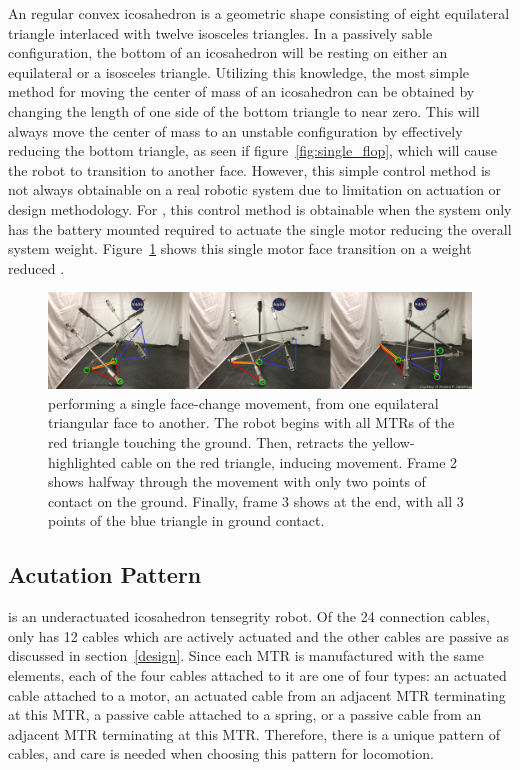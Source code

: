 An regular convex icosahedron is a geometric shape consisting of eight equilateral triangle interlaced with twelve isosceles triangles.
In a passively sable configuration, the bottom of an icosahedron will be resting on either an equilateral or a isosceles triangle.
Utilizing this knowledge, the most simple method for moving the center of mass of an icosahedron can be obtained by changing the length of one side of the bottom triangle to near zero.
This will always move the center of mass to an unstable configuration by effectively reducing the bottom triangle, as seen if figure~\ref{fig:single_flop}, which will cause the robot to transition to another face.
However, this simple control method is not always obtainable on a real robotic system due to limitation on actuation or design methodology.
For \SB{}, this control method is obtainable when the system only has the battery mounted required to actuate the single motor reducing the overall system weight.
Figure~\ref{fig:superball_flop_flat} shows this single motor face transition on a weight reduced \SB{}.

\begin{figure}[thbp]
    \centering
    \includegraphics[width=1\linewidth]{tex/img/superball_flop_combined_betterlabels}
    \caption{\SB{} performing a single face-change movement, from one equilateral triangular face to another. The robot begins with all MTRs of the red triangle touching the ground. Then, \SB{} retracts the yellow-highlighted cable on the red triangle, inducing movement. Frame 2 shows \SB{} halfway through the movement with only two points of contact on the ground. Finally, frame 3 shows \SB{} at the end, with all 3 points of the blue triangle in ground contact.}
    \label{fig:superball_flop_flat}
\end{figure}

\subsection{\SB{} Acutation Pattern}
\label{sec:pattern}
\SB{} is an underactuated icosahedron tensegrity robot.
Of the 24 connection cables, \SB{} only has 12 cables which are actively actuated and the other cables are passive as discussed in section~\ref{design}.
Since each MTR is manufactured with the same elements, each of the four cables attached to it are one of four types: an actuated cable attached to a motor, an actuated cable from an adjacent MTR terminating at this MTR, a passive cable attached to a spring, or a passive cable from an adjacent MTR terminating at this MTR.
Therefore, there is a unique pattern of cables, and care is needed when choosing this pattern for locomotion. 

